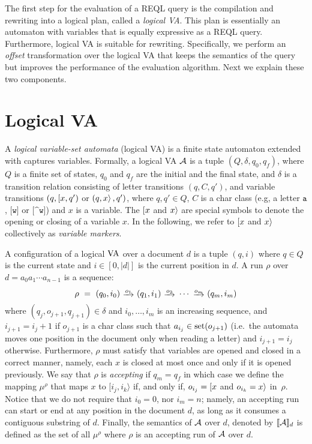 
The first step for the evaluation of a REQL query is the compilation and rewriting into a logical plan, called a \emph{logical VA}. This plan is essentially an automaton with variables that is equally expressive as a REQL query. Furthermore, logical VA is suitable for rewriting. Specifically, we perform an \emph{offset} transformation over the logical VA that keeps the semantics of the query but improves the performance of the evaluation algorithm. Next we explain these two components. %

\section{Logical VA}

A \emph{logical variable-set automata} (logical VA) is a finite state automaton extended with captures variables. %
Formally, a logical VA $\mathcal{A}$ is a tuple $(Q, \delta, q_0, q_f)$,
where $Q$ is a finite set of states, $q_0$ and $q_f$ are the initial and the final state, and $\delta$
is a transition relation consisting of letter transitions $(q, C, q')$, and variable transitions $(q, [ x, q')$ or $(q,
	x \rangle\,,q')$, where $q, q' \in Q$, $C$ is a char class (e.g, a letter $\texttt{a}$, $\texttt{[w]}$
or $\texttt{[\textasciicircum w]}$) and $x$ is a variable.
The $[ x$ and $x \rangle$ are special symbols to denote the opening or closing of a variable $x$. In the following, we refer to $[ x$ and $x \rangle$ collectively as
\emph{variable markers}.

A configuration of a logical $\mathrm{VA}$ over a document $d$ is a tuple $(q, i)$ where $q \in Q$ is the current state and \(i \in [0, |d|]\) is the current position in $d$.
A run $\rho$ over $d = a_0 a_1 \cdots a_{n-1}$ is a sequence:
$$
	\rho \ = \ (q_0, i_0) \ \trans{o_1} \ (q_1, i_1) \ \trans{o_2} \ \cdots \ \trans{o_m} \ (q_m, i_m)
$$
where $(q_j, o_{j+1}, q_{j+1}) \in \delta$ and $i_0, \ldots, i_m$ is an increasing sequence, and $i_{j+1} = i_j +1$ if $o_{j+1}$ is a char class such that $a_{i_j} \in \operatorname{set}(o_{j+1})$   (i.e.\ the automata moves one position in the document only when reading a letter) and $i_{j+1} = i_j$ otherwise. Furthermore, $\rho$ must satisfy that variables are opened and closed in a correct manner, namely, each $x$ is closed at most once and only if it is opened previously.
We say that $\rho$ is \emph{accepting} if $q_m = q_f$ in which case we define the mapping $\mu^{\rho}$ that maps $x$ to $[i_j, i_k\rangle$ if, and only if, $o_{i_j} = [ x$ and $o_{i_k} = x \rangle$ in~$\rho$. Notice that we do not require that $i_0 = 0$, nor $i_m=n$; namely, an accepting run can start or end at any position in the document $d$, as long as it consumes a contiguous substring of $d$.
Finally, the semantics of $\mathcal{A}$ over $d$, denoted by \(\llbracket\mathcal{A}\rrbracket_{d}\)
is defined as the set of all $\mu^{\rho}$ where $\rho$ is an accepting run of $\mathcal{A}$ over $d$.

